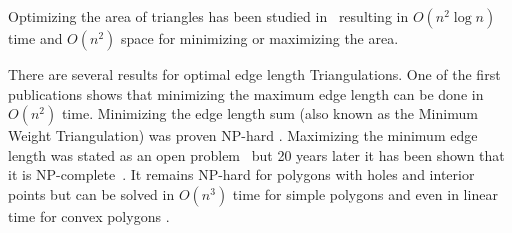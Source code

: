 Optimizing the area of triangles has been studied
in~\cite{triangulation_area} resulting in \(O(n^2 \log n)\) time
and \(O(n^2)\) space for minimizing or maximizing the area.

There are several results for optimal edge length Triangulations.
One of the first publications \cite{triangulation_minmax_length}
shows that minimizing the maximum edge length can be done in
\(O(n^2)\) time. Minimizing the edge length sum (also known as the 
Minimum Weight Triangulation) was proven NP-hard \cite{mwt_complexity}.
Maximizing the minimum edge length was stated as an open problem~%
\cite{triangulation_minmax_length} but 20 years later it has been
shown that it is NP-complete~\cite{mmlt_complexity}. It remains NP-hard
for polygons with holes and interior points \cite{mmlt_polygons}
but can be solved in \(O(n^3)\) time for simple
polygons and even in linear time for convex polygons
\cite{mmlt_convex_polygons}.

